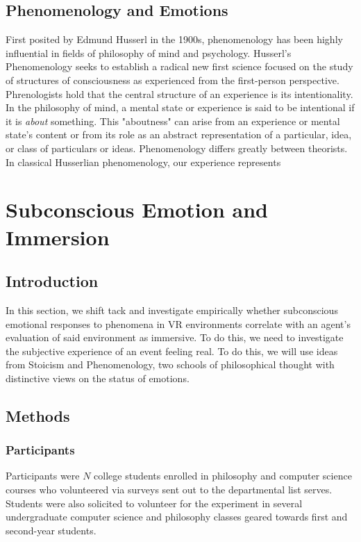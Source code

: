 \subsection{Phenomenology and Emotions}
First posited by Edmund Husserl in the 1900s, phenomenology has been highly influential in fields of philosophy of mind and psychology. Husserl's Phenomenology seeks to establish a radical new first science focused on the study of structures of consciousness as experienced from the first-person perspective. Phrenologists hold that the central structure of an experience is its intentionality. In the philosophy of mind, a mental state or experience is said to be intentional if it is \textit{about} something. This "aboutness" can arise from an experience or mental state's content or from its role as an abstract representation of a particular, idea, or class of particulars or ideas.  Phenomenology differs greatly between theorists. In classical Husserlian phenomenology, our experience represents  
\section{Subconscious Emotion and Immersion}
\subsection{Introduction}
In this section, we shift tack and investigate empirically whether subconscious emotional responses to phenomena in VR environments correlate with an agent's evaluation of said environment as immersive. To do this, we need to investigate the subjective experience of an event feeling real.  To do this, we will use ideas from Stoicism and Phenomenology, two schools of philosophical thought with distinctive views on the status of emotions. 
\subsection{Methods}
\subsubsection{Participants}
Participants were $N$ college students enrolled in philosophy and computer science courses who volunteered via surveys sent out to the departmental list serves. Students were also solicited to volunteer for the experiment in several undergraduate computer science and philosophy classes geared towards first and second-year students.
